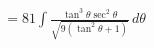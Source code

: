 \documentclass[preview]{standalone}
\begin{document}
\begin{align*}
&= 81\int \frac{\tan^3\theta\sec^2\theta}{\sqrt{9(\tan^2\theta+1)}} \, d\theta \\
\end{align*}
\end{document}
